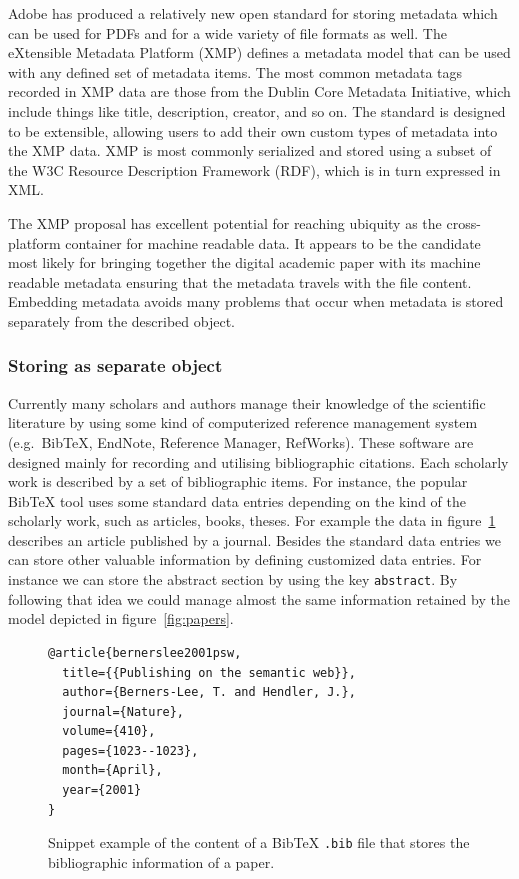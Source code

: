 Adobe has produced a relatively new open standard for storing metadata which can be used for PDFs and for a wide variety of file formats as well. The eXtensible Metadata Platform (XMP) defines a metadata model that can be used with any defined set of metadata items. The most common metadata tags recorded in XMP data are those from the Dublin Core Metadata Initiative, which include things like title, description, creator, and so on. The standard is designed to be extensible, allowing users to add their own custom types of metadata into the XMP data. XMP is most commonly serialized and stored using a subset of the W3C Resource Description Framework (RDF), which is in turn expressed in XML.

The XMP proposal has excellent potential for reaching ubiquity as the cross-platform container for machine readable data. It appears to be the candidate most likely for bringing together the digital academic paper with its machine readable metadata ensuring that the metadata travels with the file content. Embedding metadata avoids many problems that occur when metadata is stored separately from the described object.

\subsubsection{Storing as separate object}
Currently many scholars and authors manage their knowledge of the scientific literature by using some kind of computerized reference management system (e.g.\ Bib\TeX, EndNote, Reference Manager, RefWorks). These software are designed mainly for recording and utilising bibliographic citations. Each scholarly work is described by a set of bibliographic items. For instance, the popular BibTeX tool uses some standard data entries depending on the kind of the scholarly work, such as articles, books, theses. For example the data in figure~\ref{fig:bibtex_example} describes an article published by a journal. Besides the standard data entries we can store other valuable information by defining customized data entries. For instance we can store the abstract section by using the key \texttt{abstract}. By following that idea we could manage almost the same information retained by the model depicted in figure~\ref{fig:papers}.

\begin{figure}
\centering
\begin{verbatim}
@article{bernerslee2001psw,
  title={{Publishing on the semantic web}},
  author={Berners-Lee, T. and Hendler, J.},
  journal={Nature},
  volume={410},
  pages={1023--1023},
  month={April},
  year={2001}
}\end{verbatim}
\caption{Snippet example of the content of a BibTeX \texttt{.bib} file that stores the bibliographic information of a paper.}\label{fig:bibtex_example}
\end{figure}

